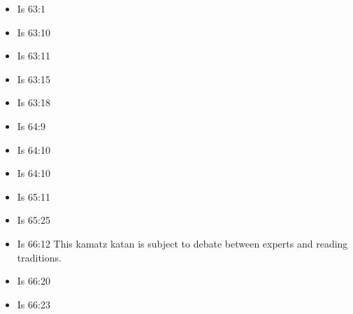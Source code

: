 \documentclass[14pt]{article}
\begin{document}
\begin{multicols}{2}
\begin{itemize}
				\item Is 63:1
				
				\item Is 63:10
				
				\item Is 63:11
				
				\item Is 63:15
				
				\item Is 63:18
				
				\item Is 64:9
				
				\item Is 64:10
				
				\item Is 64:10
				
				\item Is 65:11
				
				\item Is 65:25
				
				\item Is 66:12 This kamatz katan is subject to debate between experts and reading traditions.
				
				\item Is 66:20
				
				\item Is 66:23
				
			\end{itemize}\end{multicols}
\end{document}

